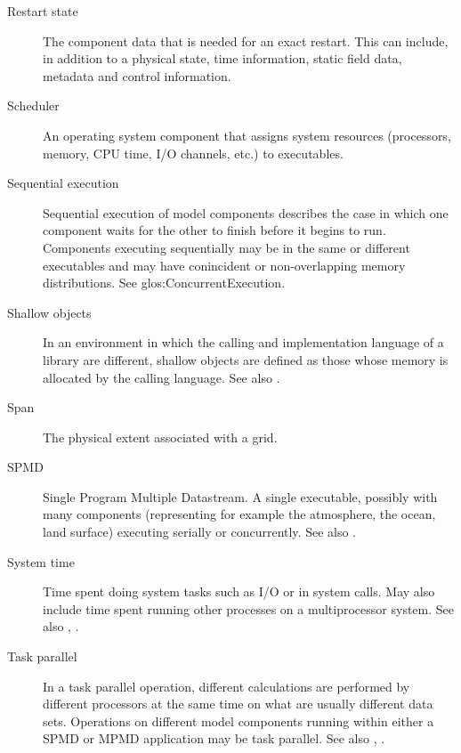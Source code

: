 \begin{description}
\item[Restart state] \label{glos:RestartState} The component 
  data that is needed for an exact restart. This can include, 
  in addition to a physical state, time information, static field data,
  metadata and control information. 

\item[Scheduler] \label{glos:Scheduler} An operating system component 
  that assigns system resources (processors, memory, CPU time, 
  I/O channels, etc.) to executables.

\item[Sequential execution] \label{glos:SequentialExecution}
  Sequential execution of model components describes the case in which 
  one component waits for the other to finish before it begins
  to run.  Components executing sequentially may be in the same or 
  different executables and may have conincident or non-overlapping 
  memory distributions.  See 
  {glos:ConcurrentExecution}.

\item[Shallow objects] \label{glos:ShallowObjects} In an environment
  in which the calling and implementation language of a library are
  different, shallow objects are defined as those whose memory is 
  allocated by the calling language. 
  See also .

\item[Span] \label{glos:Span} The physical extent associated with a grid.

\item[SPMD] \label{glos:SPMD} Single Program Multiple Datastream. 
  A single executable, possibly with many components (representing 
  for example the atmosphere, the ocean, land surface) executing 
  serially or concurrently. See also . 

\item [System time] \label{glos:SysTime}Time spent doing system tasks 
  such as I/O or in system calls.  May also include time spent running 
  other processes on a multiprocessor system. See also , .

\item[Task parallel] \label{glos:TaskParallel}  In a task parallel operation,
  different calculations are performed by different processors at the same time
  on what are usually different data sets.  Operations on different model 
  components running within either a SPMD or MPMD application may be task 
  parallel. See also , . 


\end{description}
